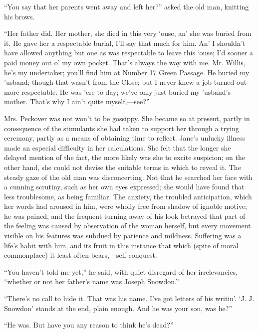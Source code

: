 {\protect\hypertarget{109}{}{}}``You say that her parents went away and
left her?'' asked the old man, knitting his brows.

``Her father did. Her mother, she died in this very `ouse, an' she was
buried from it. He gave her a respectable burial, I'll say that much for
him. An' I shouldn't have allowed anything but one as was respectable to
leave this `ouse; I'd sooner a paid money out o' my own pocket. That's
always the way with me. Mr. Willis, he's my undertaker; you'll find him
at Number 17 Green Passage. He buried my 'usband; though that wasn't
from the Close; but I never knew a job turned out more respectable. He
was 'ere to day; we've only just buried my 'usband's mother. That's why
I ain't quite myself,---see?''

Mrs. Peckover was not won't to be gossippy. She became so at present,
partly in consequence of the stimulants she had taken to support her
through a trying ceremony, partly as a means of obtaining time to
reflect. Jane's unlucky illness made an especial
{\protect\hypertarget{110}{}{}}difficulty in her calculations. She felt
that the longer she delayed mention of the fact, the more likely was she
to excite suspicion; on the other hand, she could not devise the
suitable terms in which to reveal it. The steady gaze of the old man was
disconcerting. Not that he searched her face with a cunning scrutiny,
such as her own eyes expressed; she would have found that less
troublesome, as being familiar. The anxiety, the troubled anticipation,
which her words had aroused in him, were wholly free from shadow of
ignoble motive; he was pained, and the frequent turning away of his look
betrayed that part of the feeling was caused by observation of the woman
herself, but every movement visible on his features was subdued by
patience and mildness. Suffering was a life's habit with him, and its
fruit in this instance that which (spite of moral commonplace) it least
often bears,---self-conquest.

``You haven't told me yet,'' he said, with quiet disregard of her
irrelevancies, ``whether or not her father's name was Joseph Snowdon.''

{\protect\hypertarget{111}{}{}}``There's no call to hide it. That was
his name. I've got letters of his writin'. `J. J. Snowdon' stands at the
end, plain enough. And he was your son, was he?''

``He was. But have you any reason to think he's dead?''

